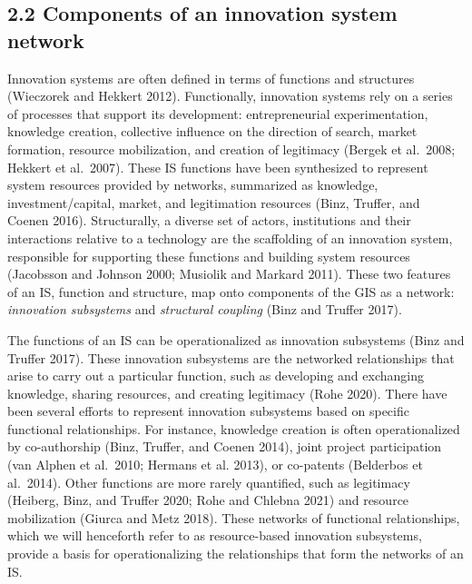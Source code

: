 \documentclass[twoside,12pt,final]{ucthesis-CA2012}
\begin{document}
\begin{ucmainmatter}
\hypertarget{components-of-an-innovation-system-network}{%
\subsection{2.2 Components of an innovation system network}\label{components-of-an-innovation-system-network}}

Innovation systems are often defined in terms of functions and
structures (Wieczorek and Hekkert
2012). Functionally,
innovation systems rely on a series of processes that support its
development: entrepreneurial experimentation, knowledge creation,
collective influence on the direction of search, market formation,
resource mobilization, and creation of legitimacy (Bergek et al.~2008;
Hekkert et al.~2007). These
IS functions have been synthesized to represent \textquotesingle system resources\textquotesingle{}
provided by networks, summarized as knowledge, investment/capital,
market, and legitimation resources (Binz, Truffer, and Coenen
2016). Structurally, a
diverse set of actors, institutions and their interactions relative to a
technology are the scaffolding of an innovation system, responsible for
supporting these functions and building system resources (Jacobsson and
Johnson 2000; Musiolik and Markard
2011). These two features
of an IS, function and structure, map onto components of the GIS as a
network: \emph{innovation subsystems} and \emph{structural coupling} (Binz and
Truffer 2017).

The functions of an IS can be operationalized as innovation subsystems
(Binz and Truffer 2017).
These innovation subsystems are the networked relationships that arise
to carry out a particular function, such as developing and exchanging
knowledge, sharing resources, and creating legitimacy (Rohe
2020). There have been
several efforts to represent innovation subsystems based on specific
functional relationships. For instance, knowledge creation is often
operationalized by co-authorship (Binz, Truffer, and Coenen
2014), joint project
participation (van Alphen et al.~2010; Hermans et al.
2013), or co-patents
(Belderbos et al.~2014).
Other functions are more rarely quantified, such as legitimacy
(Heiberg, Binz, and Truffer 2020; Rohe and Chlebna
2021) and resource
mobilization (Giurca and Metz
2018). These networks of
functional relationships, which we will henceforth refer to as
\textquotesingle resource-based innovation subsystems\textquotesingle, provide a basis for
operationalizing the relationships that form the networks of an IS.


\end{ucmainmatter}
\end{document}
